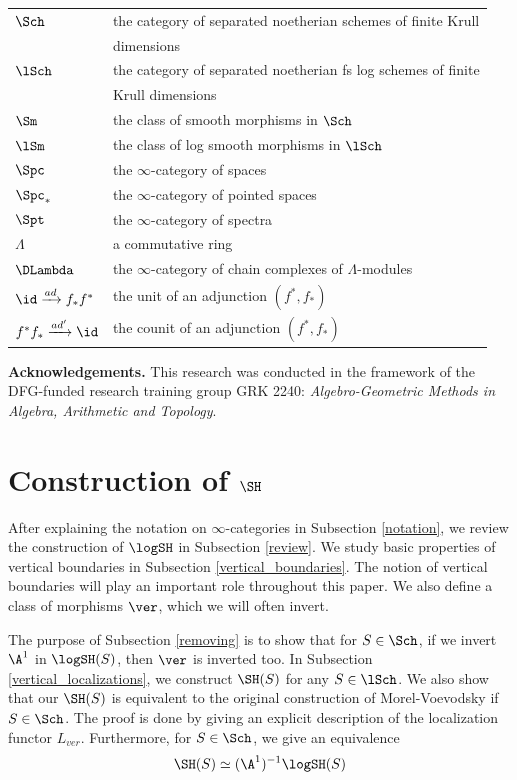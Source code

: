 \documentclass[10pt]{amsart}
\begin{document}
\begin{tabular}{l|l}
$\Sch$ & the category of separated noetherian schemes of finite Krull 
\\
& dimensions 
\\
$\lSch$ &  the category of separated noetherian fs log schemes  of finite
\\
& Krull dimensions
\\
$\Sm$ & the class of smooth morphisms in $\Sch$
\\
$\lSm$ & the class of log smooth morphisms in $\lSch$
\\
$\Spc$ & the $\infty$-category of spaces
\\
$\Spc_*$ & the $\infty$-category of pointed spaces
\\
$\Spt$ & the $\infty$-category of spectra
\\
$\Lambda$ & a commutative ring
\\
$\DLambda$ & the $\infty$-category of chain complexes of $\Lambda$-modules
\\
$\id\xrightarrow{ad}f_*f^*$ & the unit of an adjunction $(f^*,f_*)$
\\
$f^*f_*\xrightarrow{ad'}\id$ & the counit of an adjunction $(f^*,f_*)$
\end{tabular}


\vspace{0.1in}
\noindent \textbf{Acknowledgements.}
This research was conducted in the framework of the DFG-funded research training group GRK 2240: \emph{Algebro-Geometric Methods in Algebra, Arithmetic and Topology}.


\section{Construction of \texorpdfstring{$\SH$}{SH}}

After explaining the notation on $\infty$-categories in Subsection \ref{notation}, we review the construction of $\logSH$ in Subsection \ref{review}.
We study basic properties of vertical boundaries in Subsection \ref{vertical_boundaries}.
The notion of vertical boundaries will play an important role throughout this paper.
We also define a class of morphisms $\ver$, which we will often invert.

The purpose of Subsection \ref{removing} is to show that for $S\in \Sch$, if we invert $\A^1$ in $\logSH(S)$, then $\ver$ is inverted too.
In Subsection \ref{vertical_localizations}, we construct $\SH(S)$ for any $S\in \lSch$.
We also show that our $\SH(S)$ is equivalent to the original construction of Morel-Voevodsky if $S\in \Sch$.
The proof is done by giving an explicit description of the localization functor $L_{ver}$.
Furthermore, for $S\in \Sch$, we give an equivalence
\[
\SH(S)
\simeq
(\A^1)^{-1}\logSH(S)
\]
\end{document}

